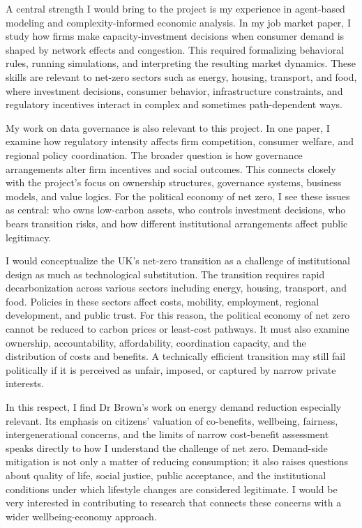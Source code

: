 \documentclass[11pt]{article}
\begin{document}
A central strength I would bring to the project is my experience in agent-based modeling and complexity-informed economic analysis. In my job market paper, I study how firms make capacity-investment decisions when consumer demand is shaped by network effects and congestion. This required formalizing behavioral rules, running simulations, and interpreting the resulting market dynamics. These skills are relevant to net-zero sectors such as energy, housing, transport, and food, where investment decisions, consumer behavior, infrastructure constraints, and regulatory incentives interact in complex and sometimes path-dependent ways.

My work on data governance is also relevant to this project. In one paper, I examine how regulatory intensity affects firm competition, consumer welfare, and regional policy coordination. The broader question is how governance arrangements alter firm incentives and social outcomes. This connects closely with the project's focus on ownership structures, governance systems, business models, and value logics. For the political economy of net zero, I see these issues as central: who owns low-carbon assets, who controls investment decisions, who bears transition risks, and how different institutional arrangements affect public legitimacy.

I would conceptualize the UK's net-zero transition as a challenge of institutional design as much as technological substitution. The transition requires rapid decarbonization across various sectors including energy, housing, transport, and food. Policies in these sectors affect costs, mobility, employment, regional development, and public trust. For this reason, the political economy of net zero cannot be reduced to carbon prices or least-cost pathways. It must also examine ownership, accountability, affordability, coordination capacity, and the distribution of costs and benefits. A technically efficient transition may still fail politically if it is perceived as unfair, imposed, or captured by narrow private interests.

In this respect, I find Dr Brown's work on energy demand reduction especially relevant. Its emphasis on citizens' valuation of co-benefits, wellbeing, fairness, intergenerational concerns, and the limits of narrow cost-benefit assessment speaks directly to how I understand the challenge of net zero. Demand-side mitigation is not only a matter of reducing consumption; it also raises questions about quality of life, social justice, public acceptance, and the institutional conditions under which lifestyle changes are considered legitimate. I would be very interested in contributing to research that connects these concerns with a wider wellbeing-economy approach.
\end{document}
